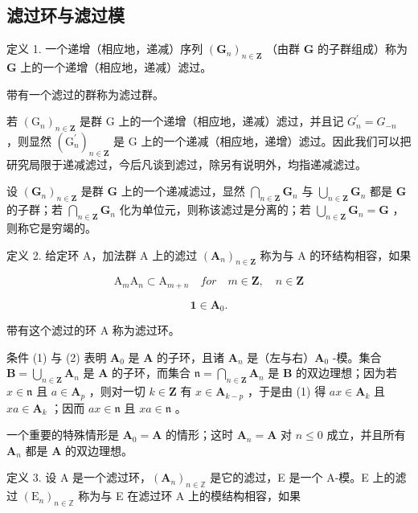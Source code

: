 \subsection{滤过环与滤过模}

定义 1. 一个递增（相应地，递减）序列 \((\mathbf{G}_n)_{n\in \mathbf{Z}}\) （由群 \(\mathbf{G}\) 的子群组成）称为 \(\mathbf{G}\) 上的一个递增（相应地，递减）滤过。

带有一个滤过的群称为滤过群。

若 \((\mathrm{G}_{n})_{n\in\mathbf{Z}}\) 是群 G 上的一个递增（相应地，递减）滤过，并且记 \(G_{n}^{\prime}=G_{-n}\) ，则显然 \((\mathrm{G}_{n}^{\prime})_{n\in\mathbf{Z}}\) 是 G 上的一个递减（相应地，递增）滤过。因此我们可以把研究局限于递减滤过，今后凡谈到滤过，除另有说明外，均指递减滤过。

设 \((\mathbf{G}_n)_{n\in \mathbf{Z}}\) 是群 \(\mathbf{G}\) 上的一个递减滤过，显然 \(\bigcap_{n\in \mathbf{Z}}\mathbf{G}_n\) 与 \(\bigcup_{n\in \mathbf{Z}}\mathbf{G}_n\) 都是 \(\mathbf{G}\) 的子群；若 \(\bigcap_{n\in \mathbf{Z}}\mathbf{G}_n\) 化为单位元，则称该滤过是分离的；若 \(\bigcup_{n\in \mathbf{Z}}\mathbf{G}_n = \mathbf{G}\) ，则称它是穷竭的。

定义 2. 给定环 A，加法群 A 上的滤过 \((\mathbf{A}_n)_{n\in \mathbf{Z}}\) 称为与 A 的环结构相容，如果

\[
\mathrm{A} _ {m} \mathrm{A} _ {n} \subset \mathrm{A} _ {m + n} \quad for \quad m \in \mathbf {Z}, \quad n \in \mathbf {Z}\tag{1}
\]

\[
\mathbf {1} \in \mathbf {A} _ {0}.\tag{2}
\]

带有这个滤过的环 A 称为滤过环。

条件 (1) 与 (2) 表明 \(\mathbf{A}_0\) 是 \(\mathbf{A}\) 的子环，且诸 \(\mathbf{A}_n\) 是（左与右）\(\mathbf{A}_0\) -模。集合 \(\mathbf{B} = \bigcup_{n \in \mathbf{Z}} \mathbf{A}_n\) 是 \(\mathbf{A}\) 的子环，而集合 \(\mathfrak{n} = \bigcap_{n \in \mathbf{Z}} \mathbf{A}_n\) 是 \(\mathbf{B}\) 的双边理想；因为若 \(x \in \mathfrak{n}\) 且 \(a \in \mathbf{A}_p\) ，则对一切 \(k \in \mathbf{Z}\) 有 \(x \in \mathbf{A}_{k-p}\) ，于是由 (1) 得 \(ax \in \mathbf{A}_k\) 且 \(xa \in \mathbf{A}_k\) ；因而 \(ax \in \mathfrak{n}\) 且 \(xa \in \mathfrak{n}\) 。

一个重要的特殊情形是 \(\mathbf{A}_0 = \mathbf{A}\) 的情形；这时 \(\mathbf{A}_n = \mathbf{A}\) 对 \(n \leqslant 0\) 成立，并且所有 \(\mathbf{A}_n\) 都是 \(\mathbf{A}\) 的双边理想。

定义 3. 设 A 是一个滤过环，\((\mathbf{A}_n)_{n\in \mathbb{Z}}\) 是它的滤过，E 是一个 A-模。E 上的滤过 \((\mathrm{E}_n)_{n\in \mathbb{Z}}\) 称为与 E 在滤过环 A 上的模结构相容，如果

